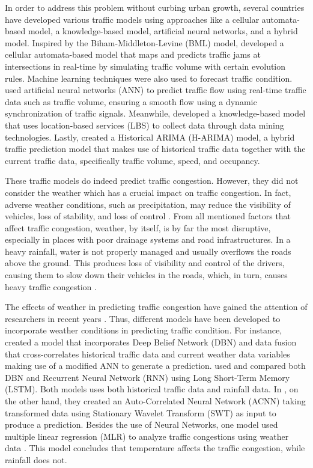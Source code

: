 In order to address this problem without curbing urban growth, several countries have developed various traffic models using approaches like a cellular automata-based model, a knowledge-based model, artificial neural networks, and a hybrid model. Inspired by the Biham-Middleton-Levine (BML) model,  developed a cellular automata-based model that maps and predicts traffic jams at intersections in real-time by simulating traffic volume with certain evolution rules. Machine learning techniques were also used to forecast traffic condition.  used artificial neural networks (ANN) to predict traffic flow using real-time traffic data such as traffic volume, ensuring a smooth flow using a dynamic synchronization of traffic signals. Meanwhile,  developed a knowledge-based model that uses location-based services (LBS) to collect data through data mining technologies. Lastly,  created a Historical ARIMA (H-ARIMA) model, a hybrid traffic prediction model that makes use of historical traffic data together with the current traffic data, specifically traffic volume, speed, and occupancy. 

These traffic models do indeed predict traffic congestion. However, they did not consider the weather which has a crucial impact on traffic congestion. In fact, adverse weather conditions, such as precipitation, may reduce the visibility of vehicles, loss of stability, and loss of control . From all mentioned factors that affect traffic congestion, weather, by itself, is by far the most disruptive, especially in places with poor drainage systems and road infrastructures. In a heavy rainfall, water is not properly managed and usually overflows the roads above the ground. This produces loss of visibility and control of the drivers, causing them to slow down their vehicles in the roads, which, in turn, causes heavy traffic congestion .

The effects of weather in predicting traffic congestion have gained the attention of researchers in recent years . Thus, different models have been developed to incorporate weather conditions in predicting traffic condition. For instance,  created a model that incorporates Deep Belief Network (DBN) and data fusion that cross-correlates historical traffic data and current weather data variables making use of a modified ANN to generate a prediction.  used and compared both DBN and Recurrent Neural Network (RNN) using Long Short-Term Memory (LSTM). Both models uses both historical traffic data and rainfall data. In , on the other hand, they created an Auto-Correlated Neural Network (ACNN) taking transformed data using Stationary Wavelet Transform (SWT) as input to produce a prediction. Besides the use of Neural Networks, one model used multiple linear regression (MLR) to analyze traffic congestions using weather data . This model concludes that temperature affects the traffic congestion, while rainfall does not.

